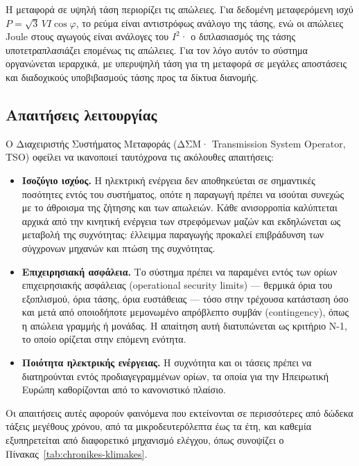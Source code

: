 Η μεταφορά σε υψηλή τάση περιορίζει τις απώλειες. Για δεδομένη μεταφερόμενη ισχύ
$P = \sqrt{3}\,V I \cos\varphi$, το ρεύμα είναι αντιστρόφως ανάλογο της τάσης, ενώ οι
απώλειες Joule στους αγωγούς είναι ανάλογες του $I^2$· ο διπλασιασμός της τάσης
υποτετραπλασιάζει επομένως τις απώλειες. Για τον λόγο αυτόν το σύστημα οργανώνεται
ιεραρχικά, με υπερυψηλή τάση για τη μεταφορά σε μεγάλες αποστάσεις και διαδοχικούς
υποβιβασμούς τάσης προς τα δίκτυα διανομής.

\subsection{Απαιτήσεις λειτουργίας}

Ο Διαχειριστής Συστήματος Μεταφοράς (ΔΣΜ· Transmission System Operator, TSO) οφείλει να
ικανοποιεί ταυτόχρονα τις ακόλουθες απαιτήσεις:

\begin{itemize}
\item \textbf{Ισοζύγιο ισχύος.} Η ηλεκτρική ενέργεια δεν αποθηκεύεται σε σημαντικές
      ποσότητες εντός του συστήματος, οπότε η παραγωγή πρέπει να ισούται συνεχώς με το
      άθροισμα της ζήτησης και των απωλειών. Κάθε ανισορροπία καλύπτεται αρχικά από την
      κινητική ενέργεια των στρεφόμενων μαζών και εκδηλώνεται ως μεταβολή της συχνότητας:
      έλλειμμα παραγωγής προκαλεί επιβράδυνση των σύγχρονων μηχανών και πτώση της
      συχνότητας.
\item \textbf{Επιχειρησιακή ασφάλεια.} Το σύστημα πρέπει να παραμένει εντός των ορίων
      επιχειρησιακής ασφάλειας (operational security limits) — θερμικά όρια του
      εξοπλισμού, όρια τάσης, όρια ευστάθειας — τόσο στην τρέχουσα κατάσταση όσο και μετά
      από οποιοδήποτε μεμονωμένο απρόβλεπτο συμβάν (contingency), όπως η απώλεια γραμμής ή
      μονάδας. Η απαίτηση αυτή διατυπώνεται ως κριτήριο N-1, το οποίο ορίζεται στην επόμενη
      ενότητα.
\item \textbf{Ποιότητα ηλεκτρικής ενέργειας.} Η συχνότητα και οι τάσεις πρέπει να
      διατηρούνται εντός προδιαγεγραμμένων ορίων, τα οποία για την Ηπειρωτική Ευρώπη
      καθορίζονται από το κανονιστικό πλαίσιο.
\end{itemize}

Οι απαιτήσεις αυτές αφορούν φαινόμενα που εκτείνονται σε περισσότερες από δώδεκα τάξεις
μεγέθους χρόνου, από τα μικροδευτερόλεπτα έως τα έτη, και καθεμία εξυπηρετείται από
διαφορετικό μηχανισμό ελέγχου, όπως συνοψίζει ο Πίνακας~\ref{tab:chronikes-klimakes}.


